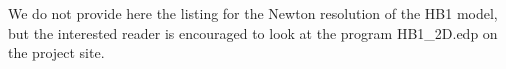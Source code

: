 \documentclass[twocolumn,10pt]{asme2ej}
\begin{document}
We do not provide here the listing for the Newton resolution of the HB1 model, but the interested reader is encouraged to look at the program {\sf  HB1\_2D.edp} on the project site.










\end{document}
